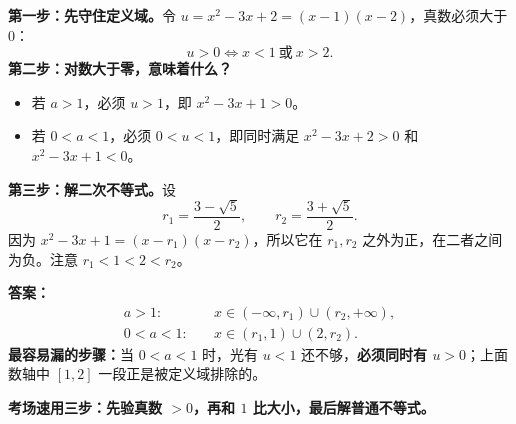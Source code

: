\begin{examplebox}
  \textbf{第一步：先守住定义域。}令 $u=x^2-3x+2=(x-1)(x-2)$，真数必须大于 $0$：
  \[u>0\iff x<1\ \text{或}\ x>2.\]
  \textbf{第二步：对数大于零，意味着什么？}
  \begin{itemize}[leftmargin=*,itemsep=0.25em,topsep=0.25em]
    \item 若 $a>1$，必须 $u>1$，即 $x^2-3x+1>0$。
    \item 若 $0<a<1$，必须 $0<u<1$，即同时满足 $x^2-3x+2>0$ 和 $x^2-3x+1<0$。
  \end{itemize}
  \textbf{第三步：解二次不等式。}设
  \[r_1=\frac{3-\sqrt5}{2},\qquad r_2=\frac{3+\sqrt5}{2}.
  \]
  因为 $x^2-3x+1=(x-r_1)(x-r_2)$，所以它在 $r_1,r_2$ 之外为正，在二者之间为负。注意 $r_1<1<2<r_2$。
  \begin{center}
  
  \end{center}
  \textbf{答案：}
  \[
  \boxed{\begin{aligned}
    a>1:\quad &x\in(-\infty,r_1)\cup(r_2,+\infty),\\[2pt]
    0<a<1:\quad &x\in(r_1,1)\cup(2,r_2).
  \end{aligned}}
  \]
  \textbf{最容易漏的步骤：}当 $0<a<1$ 时，光有 $u<1$ 还不够，\textbf{必须同时有 $u>0$}；上面数轴中 $[1,2]$ 一段正是被定义域排除的。

  \medskip
  \textbf{\textcolor{CExample}{考场速用三步：}}\textbf{先验真数 $>0$，再和 $1$ 比大小，最后解普通不等式。}
\end{examplebox}
